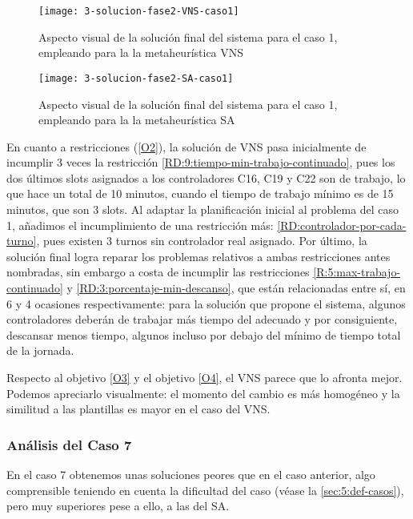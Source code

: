 \begin{figure}
	\centering
	\texttt{[image: 3-solucion-fase2-VNS-caso1]}
	\caption{Aspecto visual de la solución final del sistema para el caso 1, empleando para la \fasedos{} la metaheurística VNS}
	\label{fig:5:solucion-fase2-vns-caso1}
\end{figure}

\begin{figure} 
	\centering
	\texttt{[image: 3-solucion-fase2-SA-caso1]}
	\caption{Aspecto visual de la solución final del sistema para el caso 1, empleando para la \fasedos{} la metaheurística SA}
	\label{fig:5:solucion-fase2-sa-caso1}
\end{figure}

En cuanto a restricciones (\ref{O2}), la solución de VNS pasa inicialmente de incumplir 3 veces la restricción \ref{RD:9:tiempo-min-trabajo-continuado}, pues los dos últimos slots asignados a los controladores C16, C19 y C22 son de trabajo, lo que hace un total de 10 minutos, cuando el tiempo de trabajo mínimo es de 15 minutos, que son 3 slots.
Al adaptar la planificación inicial al problema del caso 1, añadimos el incumplimiento de una restricción más: \ref{RD:controlador-por-cada-turno}, pues existen 3 turnos sin controlador real asignado.
Por último, la solución final logra reparar los problemas relativos a ambas restricciones antes nombradas, sin embargo a costa de incumplir las restricciones \ref{R:5:max-trabajo-continuado} y \ref{RD:3:porcentaje-min-descanso}, que están relacionadas entre sí, en 6 y 4 ocasiones respectivamente: para la solución que propone el sistema, algunos controladores deberán de trabajar más tiempo del adecuado y por consiguiente, descansar menos tiempo, algunos incluso por debajo del mínimo de tiempo total de la jornada.

Respecto al objetivo \ref{O3} y el objetivo \ref{O4}, el VNS parece que lo afronta mejor. Podemos apreciarlo visualmente: el momento del cambio es más homogéneo y la similitud a las plantillas es mayor en el caso del VNS.

\subsubsection{Análisis del Caso 7}

En el caso 7 obtenemos unas soluciones peores que en el caso anterior, algo comprensible teniendo en cuenta la dificultad del caso (véase la \autoref{sec:5:def-casos}), pero muy superiores pese a ello, a las del SA. 

